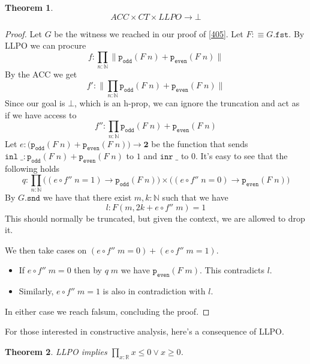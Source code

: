 \documentclass[12pt]{report}
\newtheorem{thm}{Theorem}[section]
\theoremstyle{definition}
\begin{document}
\begin{thm}
$$ACC \times CT \times LLPO \rightarrow \bot$$
\end{thm}
\begin{proof}
Let $G$ be the witness we reached in our proof of \ref{405}. 
Let $F :\equiv G.\mathtt{fst}$. 
By LLPO we can procure 
$$f : \prod_{n : \mathbb{N}} \lVert \mathtt{p_{odd}}(F\; n) + \mathtt{p_{even}}(F\;n) \rVert$$
By the ACC we get
$$f' : \big\lVert \prod_{n : \mathbb{N}}  \mathtt{p_{odd}}(F\; n) + \mathtt{p_{even}}(F\;n) \big\rVert$$
Since our goal is $\bot$, which is an h-prop, we can ignore the truncation and act as if we have access to
$$f'' : \prod_{n : \mathbb{N}}  \mathtt{p_{odd}}(F\; n) + \mathtt{p_{even}}(F\;n)$$
Let $e : \big( \mathtt{p_{odd}}(F\; n) + \mathtt{p_{even}}(F\;n)\big) \rightarrow \mathbf{2}$ be the function that sends $\mathtt{inl}\; \_ : \mathtt{p_{odd}}(F\; n) + \mathtt{p_{even}}(F\;n)$
to $1$ and $\mathtt{inr}\; \_$ to $0$. 
It's easy to see that the following holds
$$q : \prod_{n : \mathbb{N}} \big( (e\circ f''\; n = 1) \rightarrow \mathtt{p_{odd}}(F\; n) \big) \times \big( (e\circ f''\; n = 0) \rightarrow \mathtt{p_{even}}(F\; n) \big)$$
By $G.\mathtt{snd}$ we have that there exist $m,k : \mathbb{N}$ such that we have 
$$l : F(m, 2k + e\circ f''\; m) = 1$$
This should normally be truncated, but given the context, we are allowed to drop it. 

We then take cases on $(e\circ f''\; m = 0) + (e\circ f''\; m = 1)$. 
\begin{itemize}
	\item If $e\circ f''\; m = 0$ then by $q\; m$ we have $\mathtt{p_{even}}(F\; m)$. 
	This contradicts $l$. 
	\item Similarly, $e\circ f''\; m = 1$ is also in contradiction with $l$.
\end{itemize}
In either case we reach falsum, concluding the proof.
\end{proof}
For those interested in constructive analysis, here's a consequence of LLPO. 
\begin{thm}
LLPO implies $\prod_{x : \mathbb{R}}x \leq 0 \vee x \geq 0$.
\end{thm}
\end{document}
